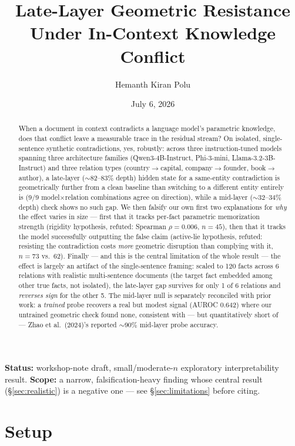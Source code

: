 \documentclass[11pt]{article}
\title{Late-Layer Geometric Resistance Under In-Context Knowledge Conflict}
\author{Hemanth Kiran Polu}
\date{July 6, 2026}
\begin{document}
\maketitle

\noindent\textbf{Status:} workshop-note draft, small/moderate-$n$ exploratory
interpretability result. \textbf{Scope:} a narrow, falsification-heavy finding
whose central result (\S\ref{sec:realistic}) is a negative one --- see \S\ref{sec:limitations}
before citing.

\begin{abstract}
When a document in context contradicts a language model's parametric knowledge,
does that conflict leave a measurable trace in the residual stream? On isolated,
single-sentence synthetic contradictions, yes, robustly: across three
instruction-tuned models spanning three architecture families (Qwen3-4B-Instruct,
Phi-3-mini, Llama-3.2-3B-Instruct) and three relation types (country$\to$capital,
company$\to$founder, book$\to$author), a late-layer ($\sim$82--83\% depth) hidden
state for a same-entity contradiction is geometrically further from a clean
baseline than switching to a different entity entirely is (9/9 model$\times$relation
combinations agree on direction), while a mid-layer ($\sim$32--34\% depth) check
shows no such gap. We then falsify our own first two explanations for \emph{why}
the effect varies in size --- first that it tracks per-fact parametric
memorization strength (rigidity hypothesis, refuted: Spearman $\rho=0.006$,
$n=45$), then that it tracks the model successfully outputting the false claim
(active-lie hypothesis, refuted: resisting the contradiction costs \emph{more}
geometric disruption than complying with it, $n=73$ vs.\ $62$). Finally ---
and this is the central limitation of the whole result --- the effect is
largely an artifact of the single-sentence framing: scaled to 120 facts across
6 relations with realistic multi-sentence documents (the target fact embedded
among other true facts, not isolated), the late-layer gap survives for only 1
of 6 relations and \emph{reverses sign} for the other 5. The mid-layer null is
separately reconciled with prior work: a \emph{trained} probe recovers a real
but modest signal (AUROC 0.642) where our untrained geometric check found none,
consistent with --- but quantitatively short of --- Zhao et al.\ (2024)'s
reported $\sim$90\% mid-layer probe accuracy.
\end{abstract}

\section{Setup}
\end{document}
